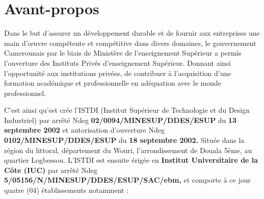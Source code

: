 \chapter*{Avant-propos}         %
\thispagestyle{fancy}
Dans le but d’assurer un développement durable et de fournir aux entreprises une main d’œuvre compétente et compétitive dans divers domaines, le gouvernement Camerounais par le biais de Ministère de l’enseignement Supérieur a permis l’ouverture des Instituts Privés d’enseignement Supérieur. Donnant ainsi l’opportunité aux institutions privées, de contribuer à l’acquisition d’une formation académique et professionnelle en adéquation avec le monde professionnel.

C’est ainsi qu’est crée l’ISTDI (Institut Supérieur de Technologie et du Design Industriel) par arrêté Ndeg \textbf{02/0094/MINESUP/DDES/ESUP}  du \textbf{13 septembre 2002}  et autorisation d’ouverture Ndeg \textbf{0102/MINESUP/DDES/ESUP}  du \textbf{18 septembre 2002.}  Située dans la région du littoral, département du Wouri, l’arrondissement de Douala 5ème, au quartier Logbessou. L’ISTDI est ensuite érigée en \textbf{Institut Universitaire de la Côte (IUC)} par arrêté Ndeg \textbf{5/05156/N/MINESUP/DDES/ESUP/SAC/ebm,} et comporte à ce jour quatre (04) établissements notamment :

